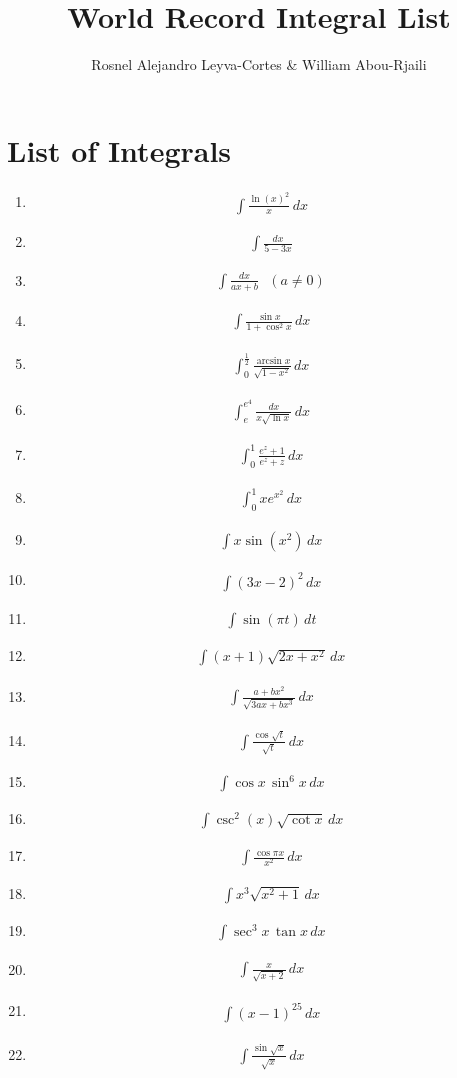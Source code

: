 \documentclass[twoside, fleqn,12pt,letterpaper]{book}
\title{\textbf{World Record Integral List}}
\author{Rosnel Alejandro Leyva-Cortes \& William Abou-Rjaili}
\newcommand{\makeitem}[2]{\item {#2}\begin{align*} {#1}
  \end{align*}}
\newcommand{\makeitemtextb}[1]{\makeitem{{#1}}{\cite{RosTextbook}}}
\begin{document}
\maketitle

\section*{List of Integrals}
\begin{multicols}{2}
\begin{enumerate}

  \makeitemtextb {\int\frac{\ln(x)^2}{x}\,dx}
  
  \makeitemtextb { \int\frac{dx}{5-3x}}
  
 \makeitemtextb{\int\frac{dx}{ax+b}\,\,\,\, (a \neq 0)}
  
  \makeitemtextb{\int\frac{\sin x}{1+\cos^2 x} \, dx}
  
  \makeitemtextb{\int_{0}^{\frac{1}{2}}\frac{\arcsin x}{\sqrt{1-x^2}} \, dx}
  
  \makeitemtextb{\int_{e}^{e^4}\frac{dx}{x\sqrt{\ln x}} \, dx}
  
  \makeitemtextb{\int_{0}^{1}\frac{e^z+1}{e^z+z} \, dx}
  
  \makeitemtextb{\int_{0}^{1}xe^{x^2} \, dx}
  
  \makeitemtextb{\int x\sin(x^2) \, dx}
  
  \makeitemtextb{\int (3x-2)^2 \, dx}
  
  \makeitemtextb{\int \sin(\pi t) \, dt}
  
  \makeitemtextb{\int (x+1)\sqrt{2x+x^2} \, dx}
  
  \makeitemtextb{\int\frac{a+bx^2}{\sqrt{3ax+bx^3}} \, dx}
  
  \makeitemtextb{\int\frac{\cos\sqrt{t}}{\sqrt{t}}\, dx}
  
 \makeitemtextb{\int \cos x \, \sin^6 x \, dx}
  
  \makeitemtextb{\int \csc^2(x)\sqrt{\cot x} \, dx}
  
 \makeitemtextb{\int\frac{\cos{\pi x}}{x^2} \, dx}
  
  \makeitemtextb{\int x^3\sqrt{x^2+1} \, dx}
  
  \makeitemtextb{\int \sec^3 x\,\tan x \, dx}
  
  \makeitemtextb{\int\frac{x}{\sqrt{x+2}} \, dx}
  
  \makeitemtextb{ \int (x-1)^{25} \, dx} %
  
  \makeitemtextb{\int\frac{\sin\sqrt{x}}{\sqrt{x}} \, dx}
  

\end{enumerate}
\end{multicols}
\end{document}
